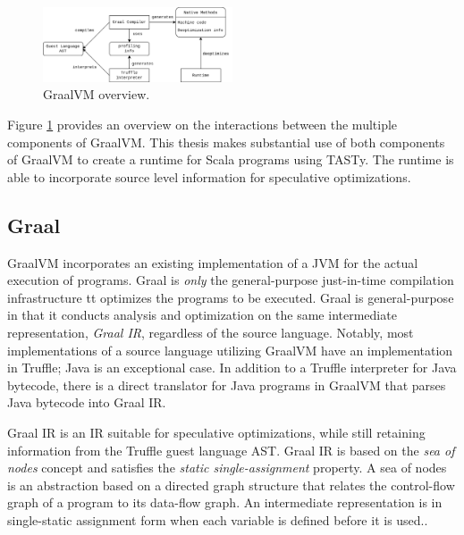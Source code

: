 \begin{figure}[!htb]
	\centering
	\includegraphics[width=0.5\textwidth]{figures/graalvm-pipeline.png}
	\caption{GraalVM overview\cite{graalvm:ir}.}
	\label{figure:graalvm-overview}
\end{figure}

Figure \ref{figure:graalvm-overview} provides an overview on the interactions between the multiple components of GraalVM.
This thesis makes substantial use of both components of GraalVM to create a runtime for Scala programs using TASTy.
The runtime is able to incorporate source level information for speculative optimizations.

\subsection{Graal}

GraalVM incorporates an existing implementation of a JVM\cite{java:hotspot} for the actual execution of programs.
Graal is \textit{only} the general-purpose just-in-time compilation infrastructure tt optimizes the programs to be executed.
Graal is general-purpose in that it conducts analysis and optimization on the same intermediate representation, \textit{Graal IR}, regardless of the source language.
Notably, most implementations of a source language utilizing GraalVM have an implementation in Truffle; Java is an exceptional case.
In addition to a Truffle interpreter for Java bytecode\cite{graalvm:espresso}, there is a direct translator for Java programs in GraalVM that parses Java bytecode into Graal IR.

Graal IR\cite{graalvm:ir} is an IR suitable for speculative optimizations, while still retaining information from the Truffle guest language AST.
Graal IR is based on the \textit{sea of nodes} concept\cite{click:sea-of-nodes} and satisfies the \textit{static single-assignment}\cite{ssa} property.
A sea of nodes is an abstraction based on a directed graph structure that relates the control-flow graph\cite{allen:ctrl-flow-analysis} of a program to its data-flow graph\cite{allen:data-flow-analysis}.
An intermediate representation is in single-static assignment form when each variable is defined before it is used.\cite{johnson:use-def-chains}.

